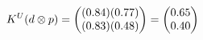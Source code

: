 \documentclass[preview]{standalone}
\begin{document}
\begin{align*}
\special{dvisvgm:raw <g id='unique000'>}K^U(d \otimes p) = \begin{pmatrix} (0.84)(0.77) \\ (0.83)(0.48) \end{pmatrix} = \begin{pmatrix} 0.65 \\ 0.40 \end{pmatrix}\special{dvisvgm:raw </g>}
\end{align*}
\end{document}
